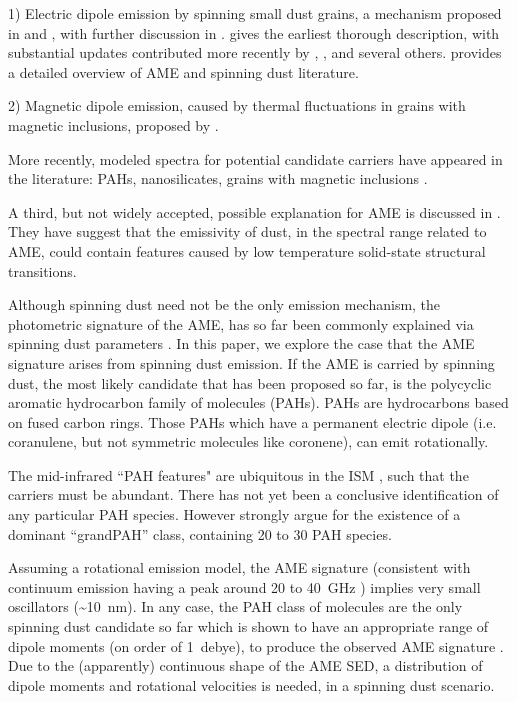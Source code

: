 \documentclass[preprint2,longabstract]{aastex}
\begin{document}
 1) Electric dipole emission by spinning small dust grains, a mechanism proposed in \cite{erickson57} and \cite{hoyle70}, with further discussion in \cite{ferrara94}. \cite{draine98b} gives the earliest thorough description, with substantial updates contributed more recently by \cite{ysard10a}, \cite{ali-haimoud09}, \cite{hoang10} and several others. \cite{dickinson13r} provides a detailed overview of AME and spinning dust literature.
 
 2) Magnetic dipole emission, caused by thermal fluctuations in grains with magnetic inclusions, proposed by \cite{draine99}. 
 
 More recently, modeled spectra for potential candidate carriers have appeared in the literature: PAHs, nanosilicates, grains with magnetic inclusions \citep{draine13, ali-haimoud14, hoang16a}. 
 
A third, but not widely accepted, possible explanation for AME is discussed in \cite{jones09}. They have suggest that the emissivity of dust, in the spectral range related to AME, could contain features caused by low temperature solid-state structural transitions. 
 

     Although spinning dust need not be the only emission mechanism, the photometric signature of the AME, has so far been commonly explained via spinning dust parameters \citep{ysard11,ali-haimoud10}. In this paper, we explore the case that the AME signature arises from spinning dust emission. If the AME is carried by spinning dust, the most likely candidate that has been proposed so far, is the polycyclic aromatic hydrocarbon family of molecules (PAHs). PAHs are hydrocarbons based on fused carbon rings. Those PAHs which have a permanent electric dipole (i.e. coranulene, but not symmetric molecules like coronene), can emit rotationally. 
     
     The mid-infrared ``PAH features" are ubiquitous in the ISM \citep{giard94,onaka96,onaka00,tielens08}, such that the carriers must be abundant. There has not yet been a conclusive identification of any particular PAH species. However \cite{andrews15} strongly argue for the  existence of a dominant ``grandPAH'' class, containing 20 to 30 PAH species. 
     
     Assuming a rotational emission model, the AME signature (consistent with continuum emission having a peak around 20 to 40~GHz ) implies very small oscillators (\textasciitilde{}10~nm). In any case, the PAH class of molecules are the only spinning dust candidate so far which is shown to have an appropriate range of dipole moments (on order of 1~debye), to produce the observed AME signature \citep{draine98b, lovas05, thorwirth07}. Due to the (apparently) continuous shape of the AME SED, a distribution of dipole moments and rotational velocities is needed, in a spinning dust scenario.
\end{document}
